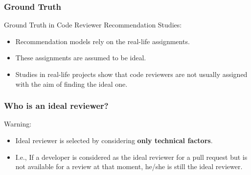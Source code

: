 \documentclass{beamer}
\begin{document}
\begin{frame}
\frametitle{\large Ground Truth}

    \begin{block}{Ground Truth in Code Reviewer Recommendation Studies:}
    \begin{itemize}
        \item Recommendation models rely on the real-life assignments.
        \item These assignments are assumed to be ideal.
        \item Studies in real-life projects show that code reviewers are not usually assigned with the aim of finding the ideal one.
    \end{itemize}    
    \end{block}

\end{frame}
\begin{frame}
\frametitle{\large Who is an ideal reviewer?}
    \pause
    \begin{alertblock}{Warning:}
        \begin{itemize}
        \item Ideal reviewer is selected by considering \textbf{only technical factors}.
        \item I.e., If a developer is considered as the ideal reviewer for a pull request but is not available for a review at that moment, he/she is still the ideal reviewer.
        \end{itemize}
    \end{alertblock}
\end{frame}
\end{document}
